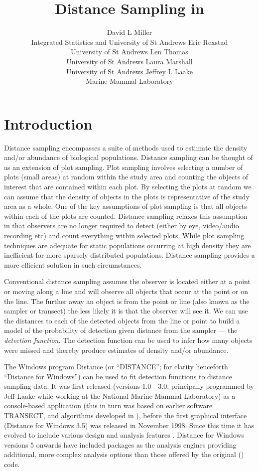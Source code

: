 \documentclass[article]{jss}
\author{David L Miller\\Integrated Statistics and University of St Andrews \AND 
        Eric Rexstad\\University of St Andrews \And 
        Len Thomas\\University of St Andrews \AND 
        Laura Marshall\\University of St Andrews \And 
        Jeffrey L Laake\\Marine Mammal Laboratory}
\title{Distance Sampling in \proglang{R}}
\begin{document}
\section{Introduction}

Distance sampling \citep{Buckland:2001vm, Buckland:2004ts, buckland2015distance} encompasses a suite of methods used to estimate the density and/or abundance of biological populations. Distance sampling can be thought of as an extension of plot sampling. Plot sampling involves selecting a number of plots (small areas) at random within the study area and counting the objects of interest that are contained within each plot. By selecting the plots at random we can assume that the density of objects in the plots is representative of the study area as a whole. One of the key assumptions of plot sampling is that all objects within each of the plots are counted. Distance sampling relaxes this assumption in that observers are no longer required to detect (either by eye, video/audio recording etc) and count everything within selected plots. While plot sampling techniques are adequate for static populations occurring at high density they are inefficient for more sparsely distributed populations. Distance sampling provides a more efficient solution in such circumstances.

Conventional distance sampling assumes the observer is located either at a point or moving along a line and will observe all objects that occur at the point or on the line. The further away an object is from the point or line (also known as the sampler or transect) the less likely it is that the observer will see it. We can use the distances to each of the detected objects from the line or point to build a model of the probability of detection given distance from the sampler --- the \textit{detection function}. The detection function can be used to infer how many objects were missed and thereby produce estimates of density and/or abundance. 

The Windows program Distance (or ``DISTANCE''; for clarity henceforth ``Distance for Windows'') can be used to fit detection functions to distance sampling data. It was first released (versions 1.0 - 3.0; principally programmed by Jeff Laake while working at the National Marine Mammal Laboratory) as a console-based application (this in turn was based on earlier software TRANSECT, \citealp{Burnham:1980wz} and algorithms developed in \citealp{Buckland:1992fa}), before the first graphical interface (Distance for Windows 3.5) was released in November 1998. Since this time it has evolved to include various design and analysis features \citep{Thomas:2010cf}. Distance for Windows versions 5 onwards have included  \citep{rcore} packages as the analysis engines providing additional, more complex analysis options than those offered by the original () code.
\end{document}
